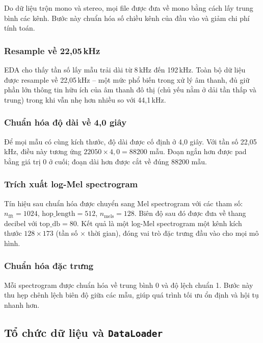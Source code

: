 Do dữ liệu trộn mono và stereo, mọi file được đưa về mono bằng cách lấy trung
bình các kênh. Bước này chuẩn hóa số chiều kênh của đầu vào và giảm chi phí tính
toán.

\subsubsection{Resample về 22{,}05\,kHz}

EDA cho thấy tần số lấy mẫu trải dài từ 8\,kHz đến 192\,kHz. Toàn bộ dữ liệu được
resample về 22{,}05\,kHz -- một mức phổ biến trong xử lý âm thanh, đủ giữ phần
lớn thông tin hữu ích của âm thanh đô thị (chủ yếu nằm ở dải tần thấp và trung)
trong khi vẫn nhẹ hơn nhiều so với 44{,}1\,kHz.

\subsubsection{Chuẩn hóa độ dài về 4{,}0 giây}

Để mọi mẫu có cùng kích thước, độ dài được cố định ở 4{,}0 giây. Với tần số
22{,}05\,kHz, điều này tương ứng $22050 \times 4{,}0 = 88200$ mẫu. Đoạn ngắn hơn
được pad bằng giá trị 0 ở cuối; đoạn dài hơn được cắt về đúng 88200 mẫu.

\subsubsection{Trích xuất log-Mel spectrogram}

Tín hiệu sau chuẩn hóa được chuyển sang Mel spectrogram với các tham số:
$n_{\text{fft}} = 1024$, $\text{hop\_length} = 512$, $n_{\text{mels}} = 128$.
Biên độ sau đó được đưa về thang decibel với $\text{top\_db} = 80$. Kết quả là
một log-Mel spectrogram một kênh kích thước $128 \times 173$ (tần số $\times$
thời gian), đóng vai trò đặc trưng đầu vào cho mọi mô hình.

\subsubsection{Chuẩn hóa đặc trưng}

Mỗi spectrogram được chuẩn hóa về trung bình 0 và độ lệch chuẩn 1. Bước này thu
hẹp chênh lệch biên độ giữa các mẫu, giúp quá trình tối ưu ổn định và hội tụ
nhanh hơn.

\subsection{Tổ chức dữ liệu và \texttt{DataLoader}}

